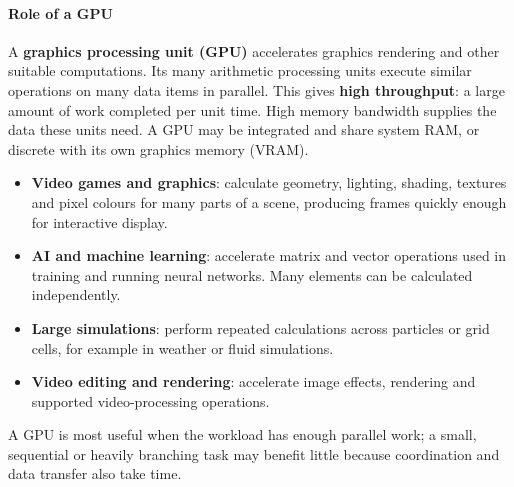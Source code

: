 \documentclass[a4paper,12pt]{article}
\begin{document}
\paragraph{Role of a GPU}
A \textbf{graphics processing unit (GPU)} accelerates graphics rendering and other suitable computations. Its many arithmetic processing units execute similar operations on many data items in parallel. This gives \textbf{high throughput}: a large amount of work completed per unit time. High memory bandwidth supplies the data these units need. A GPU may be integrated and share system RAM, or discrete with its own graphics memory (VRAM).
\begin{itemize}
    \item \textbf{Video games and graphics}: calculate geometry, lighting, shading, textures and pixel colours for many parts of a scene, producing frames quickly enough for interactive display.
    \item \textbf{AI and machine learning}: accelerate matrix and vector operations used in training and running neural networks. Many elements can be calculated independently.
    \item \textbf{Large simulations}: perform repeated calculations across particles or grid cells, for example in weather or fluid simulations.
    \item \textbf{Video editing and rendering}: accelerate image effects, rendering and supported video-processing operations.
\end{itemize}
A GPU is most useful when the workload has enough parallel work; a small, sequential or heavily branching task may benefit little because coordination and data transfer also take time.
\end{document}

